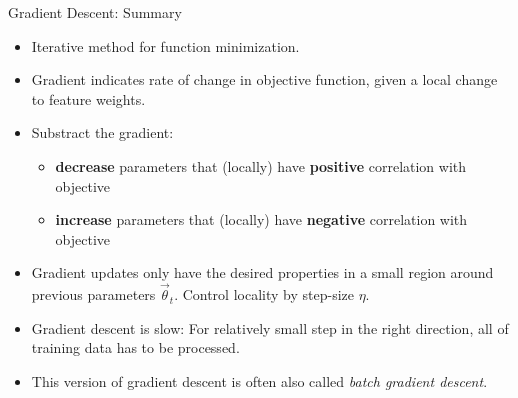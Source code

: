 
\begin{vbframe}{Gradient Descent: Summary}

\vfill

\begin{itemize}
\item Iterative method for function minimization.
\item Gradient indicates rate of change in objective function, given a local change to feature weights.
\item Substract the gradient: 
\begin{itemize}
 \item \textbf{decrease} parameters that (locally) have \textbf{positive} correlation with objective
 \item \textbf{increase} parameters that (locally) have \textbf{negative} correlation with objective
\end{itemize}
\item Gradient updates only have the desired properties in a small region around previous parameters $\vec \theta_t$. Control locality by step-size $\eta$.
\item Gradient descent is slow: For relatively small step in the right direction, all of training data has to be processed.
\item This version of gradient descent is often also called \emph{batch gradient descent}.
\end{itemize}

\vfill

\end{vbframe}



